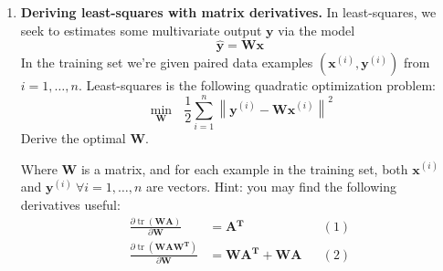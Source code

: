 \documentclass [11pt] {article}
\newcommand{\T}{\bf{T}}
\newcommand{\A}{\bf{A}}
\newcommand{\AT}{\bf{A$^{\T}$}}
\newcommand{\X}{\bf{X}}
\newcommand{\x}{\bf{x}}
\newcommand{\y}{\bf{y}}
\newcommand{\B}{\bf{B}}
\newcommand{\W}{\bf{W}}
\newenvironment{response}{\begin{responseframe}\vspace{-10pt}\paragraph{Response:}}{\end{responseframe}}
\DeclareMathOperator{\tr}{tr}
\renewcommand{\bf}[1]{\textbf{{#1}}}
\begin{document}
\begin{enumerate}
\begin{enumerate}[itemsep=10pt]
        \end{enumerate}

        \newpage
    \item \bf{Deriving least-squares with matrix derivatives.} 
        \newline
        In least-squares, we seek to estimates some multivariate output $\y$ via the model
        \[\hat{\bf{y}} = \W \x\]
        In the training set we're given paired data examples $\left( \x^{(i)}, \y^{(i)} \right)$
        from $i = 1, \ldots, n$. Least-squares is the following quadratic optimization problem:
        \[\underset{\W}{\min} \text{ } \frac{1}{2} \sum^{n}_{i = 1} \left\| \y^{(i)} - \W \x^{(i)} \right\|^2\]
        Derive the optimal $\W$. \vspace{10pt}

        Where $\W$ is a matrix, and for each example in the training set, both $\x^{(i)}$ and 
        $\y^{(i)} \ \forall i = 1, \ldots, n$ are vectors.
        \newline
        Hint: you may find the following derivatives useful:
        \begin{align*}
            \frac{\partial \tr \left( \W \A \right)}{\partial \W} &= \AT  && (1) \\
            \frac{\partial \tr \left( \W \A \W^{\T} \right)}{\partial \W} &= \W \AT + \W \A && (2)
        \end{align*}


\end{enumerate}
\end{document}
